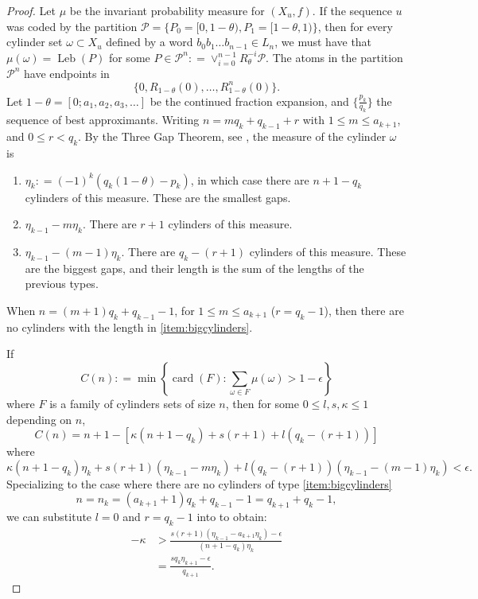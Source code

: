 \documentclass[oneside]{amsart}
\theoremstyle{plain}
\theoremstyle{definition}
\DeclareMathOperator{\card}{card}
\DeclareMathOperator{\Leb}{Leb}
\newcommand{\dfn}{\mathrel{\mathop:}=}
\newcommand{\<}{\langle}
\renewcommand{\>}{\rangle}
\renewcommand{\P}{\mathcal{P}}
\newcommand{\e}{\epsilon}
\renewcommand{\|}{|\!|} %
\begin{document}
\begin{proof}
Let $\mu$ be the invariant probability measure for $(X_u,f)$. If the sequence $u$ was coded by the partition $\P=\{P_0=[0,1-\theta),P_1=[1-\theta,1) \}$, then for every cylinder set $\omega \subset X_u$ defined by a word $b_0b_1 \dots b_{n-1} \in L_n$, we must have that $\mu(\omega) = \Leb(P)$ for some $P \in \P^n \dfn\vee_{i=0}^{n-1}R^{-i}_\theta\P. $ The atoms in the partition $\P^n$ have endpoints in 
\begin{equation*}
    \{0,R_{1-\theta}(0),\dots, R^{n}_{1-\theta}(0)\}.
\end{equation*}
Let $1-\theta = [0;a_1,a_2,a_3,\dots]$ be the continued fraction expansion, and $\{\frac{p_k}{q_k}\}$ the sequence of best approximants. Writing $n=mq_k +q_{k-1}+r$ with $1 \leq m \leq a_{k+1}$, and $0 \leq r < q_k$. By the {Three Gap Theorem}, see \cite[Section 3]{Alessandri2007ThreeDT}, the measure of the cylinder $\omega$ is 
\begin{enumerate}
    \item $\eta_k \dfn (-1)^k(q_k(1-\theta)-p_k)$, in which case there are $n+1-q_k$ cylinders of this measure. These are the smallest gaps.
    \item $\eta_{k-1} - m\eta_k$. There are  $r+1$ cylinders of this measure. 
    \item \label{item:bigcylinders} $\eta_{k-1} - (m-1)\eta_k$. There are $q_k-(r+1)$ cylinders of this measure. These are the biggest gaps, and their length is the sum of the lengths of the previous types.
\end{enumerate}
When $n=(m+1)q_k+q_{k-1}-1$, for $1\le m \le a_{k+1}$ ($r=q_{k}-1$), then there are no cylinders with the length in   \cref{item:bigcylinders}.

If 
\begin{equation*}
    C(n) \dfn \min\left\{\card(F):\sum_{\omega \in F}\mu(\omega) > 1-\e\right\}
\end{equation*}
where $F$ is a family of cylinders sets of size $n$, then for some $0\le l , s , \kappa \le 1 $ depending on $n$,
\begin{equation}
\label{eq:growthofbowenb}
    C(n) = n+1 - \left[\kappa(n+1-q_k)+s(r+1)+l(q_k-(r+1))\right]
\end{equation}
where 
\begin{equation}
\label{eq:restriction}
    \kappa(n+1-q_k)\eta_k + s(r+1)(\eta_{k-1}-m\eta_k) + l(q_k-(r+1))(\eta_{k-1}-(m-1)\eta_k) <\e.
\end{equation}
% 
Specializing to the case where there are no cylinders  of type \cref{item:bigcylinders} 
\begin{equation*}
    n = n_k= (a_{k+1}+1)q_k+q_{k-1}-1 = q_{k+1}+q_k-1,
\end{equation*}
 we can substitute $l=0$ and $r=q_k-1$ into  to obtain:
 \begin{equation}
 \label{eq:specialrestriction}
 \begin{split}
     -\kappa&>\frac{s(r+1)(\eta_{k-1}-a_{k+1}\eta_{k})
     -\e}{(n+1-q_k)\eta_k}
    \\
    &=\frac{sq_k\eta_{k+1}-\e}{q_{k+1}}.
 \end{split}
 \end{equation}
 

\end{proof}
\end{document}
